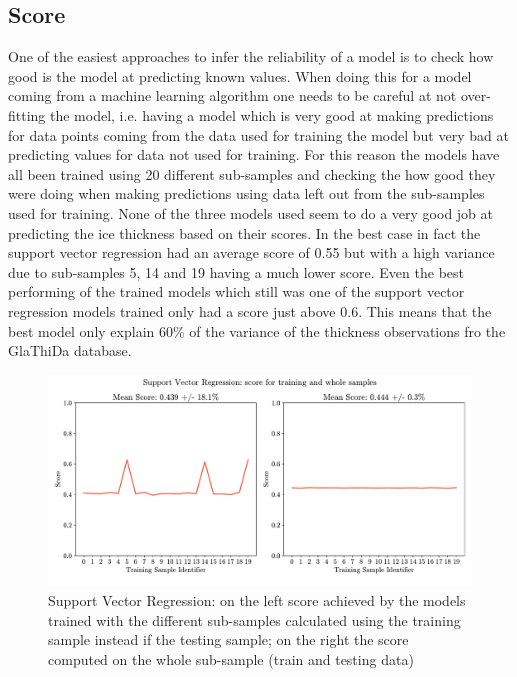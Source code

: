 \subsection{Score}\label{disc-score}

One of the easiest approaches to infer the reliability of a model is to check how good is the model at predicting known values. When doing this for a model coming from a machine learning algorithm one needs to be careful at not over-fitting the model, i.e. having a model which is very good at making predictions for data points coming from the data used for training the model but very bad at predicting values for data not used for training. For this reason the models have all been trained using 20 different sub-samples and checking the how good they were doing when making predictions using data left out from the sub-samples used for training.
None of the three models used seem to do a very good job at predicting the ice thickness based on their scores. In the best case in fact the support vector regression had an average score of 0.55 but with a high variance due to sub-samples 5, 14 and 19 having a much lower score. Even the best performing of the trained models which still was one of the support vector regression models trained only had a score just above 0.6. This means that the best model only explain 60\% of the variance of the thickness observations fro the GlaThiDa database.

\begin{figure}[!tp]
	\centering		  
	\includegraphics[width=1.\textwidth]{figures/SVR_score_tr.pdf}
	\caption{Support Vector Regression: on the left score achieved by the models trained with the different sub-samples calculated using the training sample instead if the testing sample; on the right the score computed on the whole sub-sample (train and testing data)}
	\label{fig:train-score}
\end{figure}

